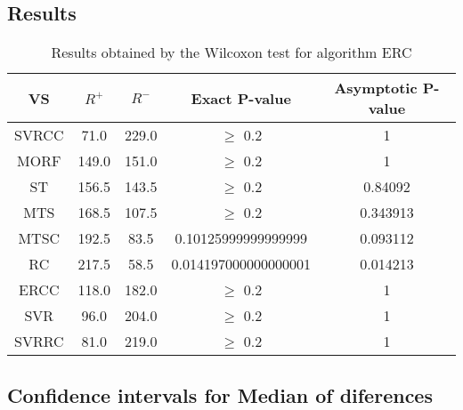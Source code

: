 \documentclass[a4paper,10pt]{article}
\begin{document}
\subsection{Results}

\begin{table}[!htp]
\centering\small
\begin{tabular}{
|c|c|c|c|c|}
\hline
 VS & $R^{+}$ & $R^{-}$ & Exact P-value & Asymptotic P-value \\ \hline 
SVRCC & 71.0 & 229.0 & $\geq$ 0.2 & 1\\ \hline 
MORF & 149.0 & 151.0 & $\geq$ 0.2 & 1\\ \hline 
ST & 156.5 & 143.5 & $\geq$ 0.2 & 0.84092\\ \hline 
MTS & 168.5 & 107.5 & $\geq$ 0.2 & 0.343913\\ \hline 
MTSC & 192.5 & 83.5 & 0.10125999999999999 & 0.093112\\ \hline 
RC & 217.5 & 58.5 & 0.014197000000000001 & 0.014213\\ \hline 
ERCC & 118.0 & 182.0 & $\geq$ 0.2 & 1\\ \hline 
SVR & 96.0 & 204.0 & $\geq$ 0.2 & 1\\ \hline 
SVRRC & 81.0 & 219.0 & $\geq$ 0.2 & 1\\ \hline 

\end{tabular}
\caption{Results obtained by the Wilcoxon test for algorithm ERC}
\end{table}

\subsection{Confidence intervals for Median of diferences}
\end{document}
